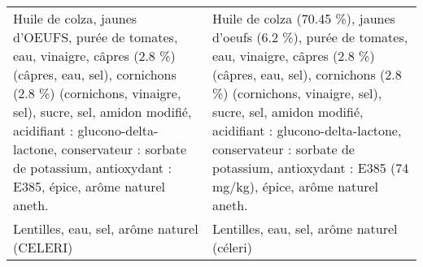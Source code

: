 \begin{tabular}{p{7cm}p{7cm}}
                                                                                                                                                                                                                                                                                                                                                                                                                                                                                                       Huile de colza, jaunes d'OEUFS, purée de tomates, eau, vinaigre, câpres (2.8 \%) (câpres, eau, sel), cornichons (2.8 \%) (cornichons, vinaigre, sel), sucre, sel,  amidon modifié, acidifiant : glucono-delta-lactone, conservateur : sorbate de potassium, antioxydant : E385, épice, arôme naturel aneth. &                                                                                                                                                                                                                                                                                                                                                                                                                                                                      Huile de colza (70.45 \%), jaunes d'oeufs (6.2 \%), purée de tomates, eau, vinaigre, câpres (2.8 \%) (câpres, eau, sel), cornichons (2.8 \%) (cornichons, vinaigre, sel), sucre, sel, amidon modifié, acidifiant : glucono-delta-lactone, conservateur : sorbate de potassium, antioxydant : E385 (74 mg/kg), épice, arôme naturel aneth. \\
                                                                                                                                                                                                                                                                                                                                                                                                                                                                                                                                                                                                                                                                                                                                                                     Lentilles, eau, sel, arôme naturel (CELERI) &                                                                                                                                                                                                                                                                                                                                                                                                                                                                                                                                                                                                                                                                                                                                                                Lentilles, eau, sel, arôme naturel (céleri) \\

\end{tabular}
